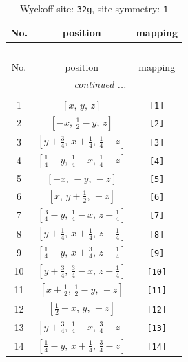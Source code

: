 \documentclass[fleqn,8pt]{jsarticle}
\begin{document}
\renewcommand{\arraystretch}{1.2}
\begin{longtable}{ccc}
\caption{Wyckoff site: {\tt 32g}, site symmetry: {\tt 1}}
 \\
 \hline \hline
No. & position & mapping \\ \hline \endfirsthead

\multicolumn{2}{l}{\tablename\ \thetable{}} \\
 \hline \hline
No. & position & mapping \\ \hline \endhead

 \hline \hline
\multicolumn{2}{r}{\footnotesize\it continued ...} \\ \endfoot

 \hline \hline
\multicolumn{2}{r}{} \\ \endlastfoot

1 & $\left[ x,\, y,\, z \right]$ & {\tt [1]} \\ \hline
2 & $\left[ - x,\, \frac{1}{2} - y,\, z \right]$ & {\tt [2]} \\ \hline
3 & $\left[ y + \frac{3}{4},\, x + \frac{1}{4},\, \frac{1}{4} - z \right]$ & {\tt [3]} \\ \hline
4 & $\left[ \frac{1}{4} - y,\, \frac{1}{4} - x,\, \frac{1}{4} - z \right]$ & {\tt [4]} \\ \hline
5 & $\left[ - x,\, - y,\, - z \right]$ & {\tt [5]} \\ \hline
6 & $\left[ x,\, y + \frac{1}{2},\, - z \right]$ & {\tt [6]} \\ \hline
7 & $\left[ \frac{3}{4} - y,\, \frac{1}{4} - x,\, z + \frac{1}{4} \right]$ & {\tt [7]} \\ \hline
8 & $\left[ y + \frac{1}{4},\, x + \frac{1}{4},\, z + \frac{1}{4} \right]$ & {\tt [8]} \\ \hline
9 & $\left[ \frac{1}{4} - y,\, x + \frac{3}{4},\, z + \frac{1}{4} \right]$ & {\tt [9]} \\ \hline
10 & $\left[ y + \frac{3}{4},\, \frac{3}{4} - x,\, z + \frac{1}{4} \right]$ & {\tt [10]} \\ \hline
11 & $\left[ x + \frac{1}{2},\, \frac{1}{2} - y,\, - z \right]$ & {\tt [11]} \\ \hline
12 & $\left[ \frac{1}{2} - x,\, y,\, - z \right]$ & {\tt [12]} \\ \hline
13 & $\left[ y + \frac{3}{4},\, \frac{1}{4} - x,\, \frac{3}{4} - z \right]$ & {\tt [13]} \\ \hline
14 & $\left[ \frac{1}{4} - y,\, x + \frac{1}{4},\, \frac{3}{4} - z \right]$ & {\tt [14]} \\ \hline

\end{longtable}
\end{document}
